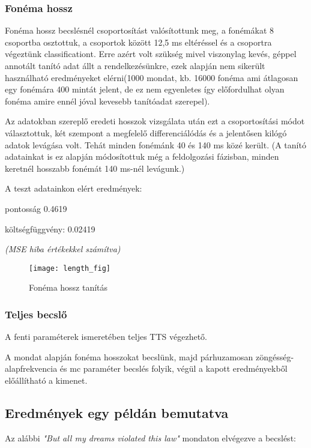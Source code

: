 \subsubsection{Fonéma hossz}
Fonéma hossz becslésnél csoportosítást valósítottunk meg, a fonémákat 8 csoportba osztottuk, a csoportok között 12,5 ms eltéréssel és a csoportra végeztünk classificationt. Erre azért volt szükség mivel viszonylag kevés, géppel annotált tanító adat állt a rendelkezésünkre, ezek alapján nem sikerült használható eredményeket elérni(1000 mondat, kb. 16000 fonéma ami átlagosan egy fonémára 400 mintát jelent, de ez nem egyenletes így előfordulhat olyan fonéma amire ennél jóval kevesebb tanítóadat szerepel). 

Az adatokban szereplő eredeti hosszok vizsgálata után ezt a csoportosítási módot választottuk, két szempont a megfelelő differenciálódás és a jelentősen kilógó adatok levágása volt. Tehát minden fonémánk 40 és 140 ms közé került. (A tanító adatainkat is ez alapján módosítottuk még a feldolgozási fázisban, minden keretnél hosszabb fonémát 140 ms-nél levágunk.)


A teszt adatainkon elért eredmények:
	
pontosság 0.4619
	
költségfüggvény: 0.02419
	
\textit{(MSE hiba értékekkel számítva)}

\begin{figure}[h]
	\par\centering	
	\texttt{[image: length\_fig]}
	\caption{Fonéma hossz tanítás}
\end{figure}
\subsubsection{Teljes becslő}
A fenti paraméterek ismeretében teljes TTS végezhető. 

A mondat alapján fonéma hosszokat becslünk, majd párhuzamosan zöngésség-alapfrekvencia és mc paraméter becslés folyik, végül a kapott eredményekből előállítható a kimenet.
\clearpage
\subsection{Eredmények egy példán bemutatva}
Az alábbi {\it"But all my dreams violated this law"} mondaton elvégezve a becslést:
